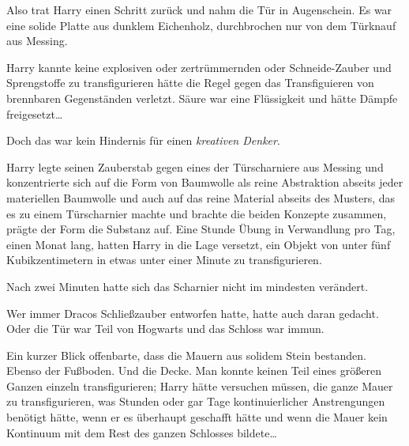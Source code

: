 Also trat Harry einen Schritt zurück und nahm die Tür in Augenschein. Es war eine solide Platte aus dunklem Eichenholz, durchbrochen nur von dem Türknauf aus Messing.

Harry kannte keine explosiven oder zertrümmernden oder Schneide-Zauber und Sprengstoffe zu transfigurieren hätte die Regel gegen das Transfiguieren von brennbaren Gegenständen verletzt. Säure war eine Flüssigkeit und hätte Dämpfe freigesetzt…

Doch das war kein Hindernis für einen \emph{kreativen Denker}.

Harry legte seinen Zauberstab gegen eines der Türscharniere aus Messing und konzentrierte sich auf die Form von Baumwolle als reine Abstraktion abseits jeder materiellen Baumwolle und auch auf das reine Material abseits des Musters, das es zu einem Türscharnier machte und brachte die beiden Konzepte zusammen, prägte der Form die Substanz auf. Eine Stunde Übung in Verwandlung pro Tag, einen Monat lang, hatten Harry in die Lage versetzt, ein Objekt von unter fünf Kubikzentimetern in etwas unter einer Minute zu transfigurieren.

Nach zwei Minuten hatte sich das Scharnier nicht im mindesten verändert.

Wer immer Dracos Schließzauber entworfen hatte, hatte auch daran gedacht. Oder die Tür war Teil von Hogwarts und das Schloss war immun.

Ein kurzer Blick offenbarte, dass die Mauern aus solidem Stein bestanden. Ebenso der Fußboden. Und die Decke. Man konnte keinen Teil eines größeren Ganzen einzeln transfigurieren; Harry hätte versuchen müssen, die ganze Mauer zu transfigurieren, was Stunden oder gar Tage kontinuierlicher Anstrengungen benötigt hätte, wenn er es überhaupt geschafft hätte und wenn die Mauer kein Kontinuum mit dem Rest des ganzen Schlosses bildete…

